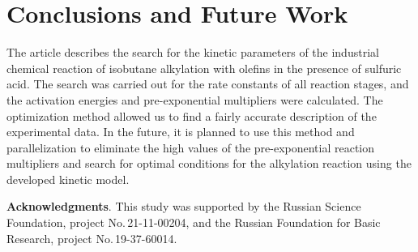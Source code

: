 \documentclass{svproc}
\begin{document}
\section{Conclusions and Future Work}
The article describes the search for the kinetic parameters of the industrial chemical reaction of isobutane alkylation with olefins in the presence of sulfuric acid. The search was carried out for the rate constants of all reaction stages, and the activation energies and pre-exponential multipliers were calculated. The optimization method allowed us to find a fairly accurate description of the experimental data. In the future, it is planned to use this method and parallelization to eliminate the high values of the pre-exponential reaction multipliers and search for optimal conditions for the alkylation reaction using the developed kinetic model.

\medskip

\textbf{Acknowledgments}. This study was supported by the Russian Science Foundation, project No.\,21-11-00204, and the Russian Foundation for Basic Research, project No.\,19-37-60014.

%
%

{}
\end{document}
